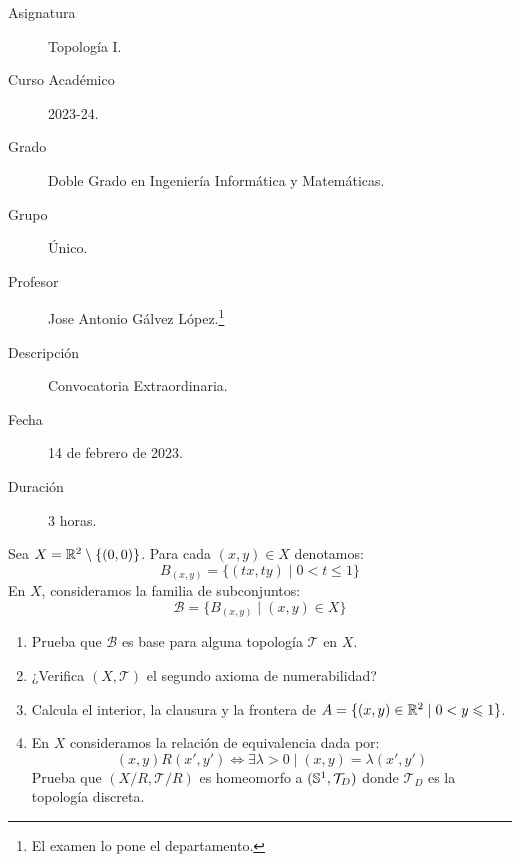 \documentclass[12pt]{article}
\begin{document}

    
    

    \begin{description}
        \item[Asignatura] Topología I.
        \item[Curso Académico] 2023-24.
        \item[Grado] Doble Grado en Ingeniería Informática y Matemáticas.
        \item[Grupo] Único.
        \item[Profesor] Jose Antonio Gálvez López.\footnote{El examen lo pone el departamento.}
        \item[Descripción] Convocatoria Extraordinaria.
        \item[Fecha] 14 de febrero de 2023.
        \item[Duración] 3 horas.
    
    \end{description}
    \newpage

    \begin{ejercicio}[4.5 puntos]
        Sea $X = \mathbb{R}^2 \setminus \{(0,0)\}$. Para cada $(x,y) \in X$ denotamos:
        $$B_{(x,y)} = \{(tx, ty) \mid 0 < t \leq 1 \}$$
        En $X$, consideramos la familia de subconjuntos:
        $$\mathcal{B} = \{B_{(x,y)} \mid (x,y) \in X\}$$
        \begin{enumerate}[label=(\alph*)]
            \item Prueba que $\mathcal{B}$ es base para alguna topología $\mathcal{T}$ en $X$.
            \item ¿Verifica $(X, \mathcal{T})$ el segundo axioma de numerabilidad?
            \item Calcula el interior, la clausura y la frontera de $A = \{ (x,y) \in \mathbb{R}^2 \mid 0 < y \leqslant 1\}$.
            \item En $X$ consideramos la relación de equivalencia dada por:
                $$(x,y)R(x',y') \Leftrightarrow \exists \lambda > 0 \mid (x,y) = \lambda(x',y')$$
                Prueba que $(X/R, \mathcal{T}/R)$ es homeomorfo a $(\mathbb{S}^1, \mathcal{T}_D)$ donde $\mathcal{T}_D$ es la topología discreta.
        \end{enumerate}
    \end{ejercicio}
        
\end{document}
